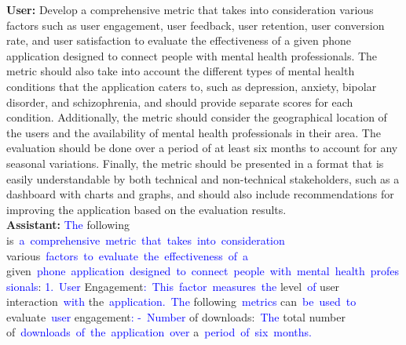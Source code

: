 \begin{tcolorbox}[colframe=gray!70!black,colback=white, title=Sample 6]
\textbf{User:}
Develop a comprehensive metric that takes into consideration various factors such as user engagement, user feedback, user retention, user conversion rate, and user satisfaction to evaluate the effectiveness of a given phone application designed to connect people with mental health professionals. The metric should also take into account the different types of mental health conditions that the application caters to, such as depression, anxiety, bipolar disorder, and schizophrenia, and should provide separate scores for each condition. Additionally, the metric should consider the geographical location of the users and the availability of mental health professionals in their area. The evaluation should be done over a period of at least six months to account for any seasonal variations. Finally, the metric should be presented in a format that is easily understandable by both technical and non-technical stakeholders, such as a dashboard with charts and graphs, and should also include recommendations for improving the application based on the evaluation results. \vspace{0.1in} \\
\textbf{Assistant:}
\textcolor{blue}{The} following is\textcolor{blue}{~a}\textcolor{blue}{~comprehensive}\textcolor{blue}{~metric}\textcolor{blue}{~that}\textcolor{blue}{~takes}\textcolor{blue}{~into}\textcolor{blue}{~consideration} various\textcolor{blue}{~factors}\textcolor{blue}{~to}\textcolor{blue}{~evaluate}\textcolor{blue}{~the}\textcolor{blue}{~effectiveness}\textcolor{blue}{~of}\textcolor{blue}{~a} given\textcolor{blue}{~phone}\textcolor{blue}{~application}\textcolor{blue}{~designed}\textcolor{blue}{~to}\textcolor{blue}{~connect}\textcolor{blue}{~people}\textcolor{blue}{~with}\textcolor{blue}{~mental}\textcolor{blue}{~health}\textcolor{blue}{~professionals}:
\textcolor{blue}{1}\textcolor{blue}{.}\textcolor{blue}{~User} Engagement\textcolor{blue}{:}\textcolor{blue}{~This}\textcolor{blue}{~factor}\textcolor{blue}{~measures}\textcolor{blue}{~the} level\textcolor{blue}{~of} user interaction\textcolor{blue}{~with} the\textcolor{blue}{~application}\textcolor{blue}{.}\textcolor{blue}{~The} following\textcolor{blue}{~metrics} can\textcolor{blue}{~be}\textcolor{blue}{~used}\textcolor{blue}{~to} evaluate\textcolor{blue}{~user} engagement\textcolor{blue}{:
}\textcolor{blue}{-}\textcolor{blue}{~Number} of downloads:\textcolor{blue}{~The} total number of\textcolor{blue}{~downloads}\textcolor{blue}{~of}\textcolor{blue}{~the}\textcolor{blue}{~application}\textcolor{blue}{~over} a\textcolor{blue}{~period}\textcolor{blue}{~of}\textcolor{blue}{~six}\textcolor{blue}{~months}\textcolor{blue}{.
}
\end{tcolorbox}
